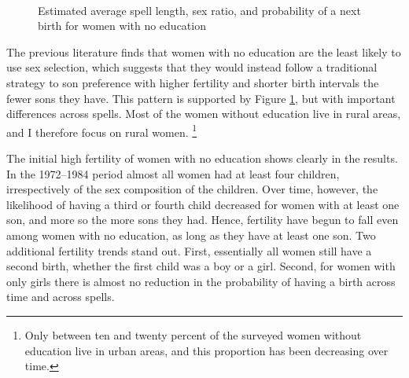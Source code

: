 \documentclass[12pt,letterpaper]{article}
\begin{document}
\begin{figure}[htpb]
\centering
{}
\\
\caption{Estimated average spell length, sex ratio, and probability of 
a next birth for women with no education}
\label{fig:bootstrap_low}
\end{figure}

The previous literature finds that women with no education are the least likely to use 
sex selection, which suggests that they would instead follow a traditional strategy to son 
preference with higher fertility and shorter birth intervals the fewer sons they have.
This pattern is supported by Figure \ref{fig:bootstrap_low}, but with important
differences across spells.
Most of the women without education live in rural areas, and I therefore focus on rural 
women.%
\footnote{
Only between ten and twenty percent of the surveyed women without education live in urban 
areas, and this proportion has been decreasing over time.
}

The initial high fertility of women with no education shows clearly in the results.
In the 1972--1984 period almost all women had at least four children, irrespectively
of the sex composition of the children.
Over time, however, the likelihood of having a third or fourth child decreased for women 
with at least one son, and more so the more sons they had.
Hence, fertility have begun to fall even among women with no education, as long as they 
have at least one son.
Two additional fertility trends stand out.
First, essentially all women still have a second birth, whether the first child was
a boy or a girl.
Second, for women with only girls there is almost no reduction in the probability of 
having a birth across time and across spells.
\end{document}
